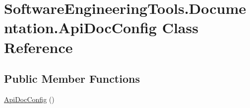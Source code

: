 \hypertarget{class_software_engineering_tools_1_1_documentation_1_1_api_doc_config}{\section{Software\+Engineering\+Tools.\+Documentation.\+Api\+Doc\+Config Class Reference}
\label{class_software_engineering_tools_1_1_documentation_1_1_api_doc_config}
}
\subsection*{Public Member Functions}
\begin{DoxyCompactItemize}
\item 
\hyperlink{class_software_engineering_tools_1_1_documentation_1_1_api_doc_config_ac9115d6a7d716fb3db5cf689f19fb1cf}{Api\+Doc\+Config} ()
\end{DoxyCompactItemize}
